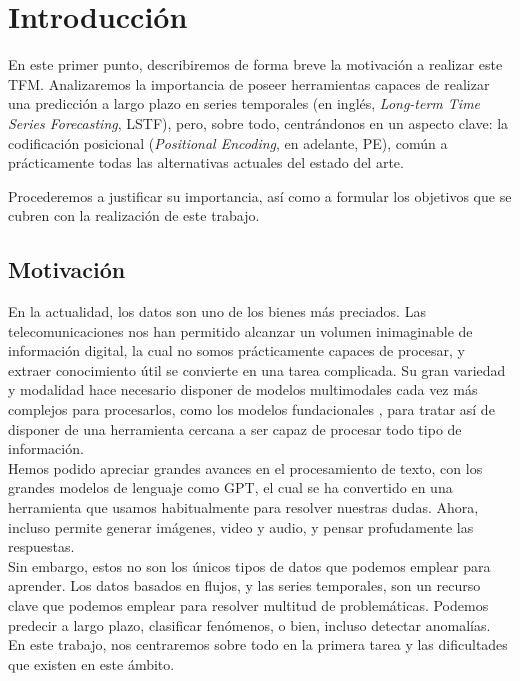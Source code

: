 \chapter{Introducción}

En este primer punto, describiremos de forma breve la motivación a realizar este TFM. Analizaremos la importancia de poseer herramientas capaces de realizar una predicción a largo plazo en series temporales (en inglés,\textit{ Long-term Time Series Forecasting},  LSTF), pero, sobre todo, centrándonos en un aspecto clave: la codificación posicional (\textit{Positional Encoding}, en adelante, PE), común a prácticamente todas las alternativas actuales del estado del arte. 

Procederemos a justificar su importancia, así como a formular los objetivos que se cubren con la realización de este trabajo.
\section{Motivación}

En la actualidad, los datos son uno de los bienes más preciados. Las telecomunicaciones nos han permitido alcanzar un volumen inimaginable de información digital, la cual no somos prácticamente capaces de procesar, y extraer conocimiento útil se convierte en una tarea complicada. Su gran variedad y modalidad hace necesario disponer de modelos multimodales cada vez más complejos para procesarlos, como los modelos fundacionales \cite{bommasani2022opportunitiesrisksfoundationmodels}, para tratar así de disponer de una herramienta cercana a ser capaz de procesar todo tipo de información.\\

Hemos podido apreciar grandes avances en el procesamiento de texto, con los grandes modelos de lenguaje como GPT, el cual se ha convertido en una herramienta que usamos habitualmente para resolver nuestras dudas. Ahora, incluso permite generar imágenes, video y audio, y pensar profudamente las respuestas.\\

Sin embargo, estos no son los únicos tipos de datos que podemos emplear para aprender. Los datos basados en flujos, y las series temporales, son un recurso clave que podemos emplear para resolver multitud de problemáticas. Podemos predecir a largo plazo, clasificar fenómenos, o bien, incluso detectar anomalías. En este trabajo, nos centraremos sobre todo en la primera tarea y las dificultades que existen en este ámbito.

